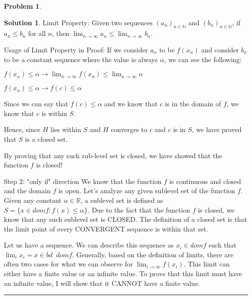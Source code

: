 \documentclass{article}
\theoremstyle{definition}
\newtheorem{problem}{Problem}
\def\fline{\rule{0.75\linewidth}{0.5pt}}
\newcommand{\finishline}{\begin{center}\fline\end{center}}
\newtheorem*{solution*}{Solution}
\newenvironment{solution}{\begin{solution*}}{{\finishline} \end{solution*}}
\begin{document}
\begin{problem}
\begin{solution}
Limit Property: \newline 
Given two sequences $(a_n)_{n \in \mathbb{N}}$ and $(b_n)_{n \in \mathbb{N}}$, if $a_n \leq b_n$ for all $n$, then  $\lim_{n\to\infty} a_n \leq \lim_{n\to\infty} b_n$. 

Usage of Limit Property in Proof: \newline 
If we consider $a_n$ to be $f(x_n)$ and consider $b_n$ to be a constant sequence where the value is always $\alpha$, we can see the following: \newline 

$f(x_n) \leq \alpha \rightarrow \lim_{n\to\infty} f(x_n) \leq \lim_{n\to\infty} \alpha$ \newline 

$f(x_n) \leq \alpha \rightarrow f(c) \leq \alpha$ \newline 

Since we can say that $f(c) \leq \alpha$ and we know that $c$ is in the domain of $f$, we know that $c$ is within $S$. \newline 


Hence, since $H$ lies within $S$ and $H$ converges to $c$ and $c$ is in $S$, we have proved that $S$ is a closed set. \newline 


By proving that any such sub-level set is closed, we have showed that the function $f$ is closed! \newline 




Step 2: "only if" direction \newline 
We know that the function $f$ is continuous and closed and the domain $f$ is open. Let's analyze any given sublevel set of the function $f$. Given any constant $\alpha \in \mathbb{R}$, a sublevel set is defined as $S = \{x \in dom f : f(x) \leq \alpha \}$. Due to the fact that the function $f$ is closed, we know that any such sublevel set is CLOSED. The definition of a closed set is that the limit point of every CONVERGENT sequence is within that set. 

Let us have a sequence. We can describe this sequence as $x_i \in dom f$ such that $\lim_{i} x_i = x \in bd \enspace dom f$. Generally, based on the definition of limits, there are often two cases for what we can observe for $\lim_{i\to\infty} f(x_i)$. This limit can either have a finite value or an infinite value. To prove that this limit must have an infinite value, I will show that it CANNOT have a finite value. \newline 


\end{solution}
\end{problem}
\end{document}

